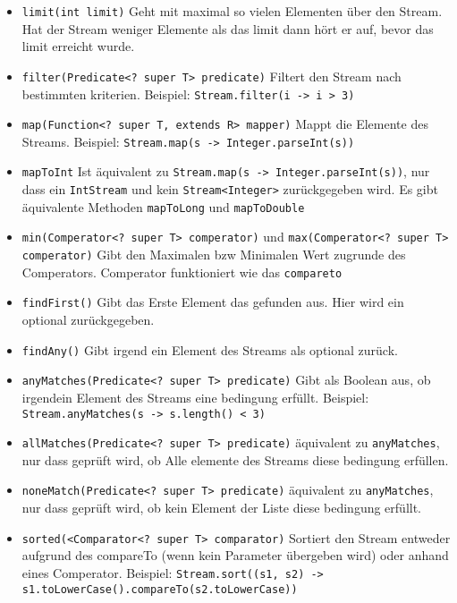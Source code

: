 \begin{itemize}
    \item \lstinline{limit(int limit)} Geht mit maximal so vielen Elementen
          über den Stream. Hat der Stream weniger Elemente als das limit dann
          hört er auf, bevor das limit erreicht wurde.
    \item \lstinline{filter(Predicate<? super T> predicate)} Filtert den Stream nach bestimmten
          kriterien. Beispiel: \lstinline{Stream.filter(i -> i > 3)}
    \item \lstinline{map(Function<? super T, extends R> mapper)} Mappt die Elemente des Streams.
          Beispiel: \lstinline{Stream.map(s -> Integer.parseInt(s))}
    \item \lstinline{mapToInt} Ist äquivalent zu \lstinline{Stream.map(s -> Integer.parseInt(s))},
          nur dass ein \lstinline{IntStream} und kein \lstinline{Stream<Integer>} zurückgegeben wird.
          Es gibt äquivalente Methoden \lstinline{mapToLong} und \lstinline{mapToDouble}
    \item \lstinline{min(Comperator<? super T> comperator)} und \lstinline{max(Comperator<? super T> comperator)}
          Gibt den Maximalen bzw Minimalen Wert zugrunde des Comperators. Comperator funktioniert
          wie das \lstinline{compareto}
    \item \lstinline{findFirst()} Gibt das Erste Element das gefunden aus. Hier wird ein
          \gls{optional} zurückgegeben.
    \item \lstinline{findAny()} Gibt irgend ein Element des Streams als \gls{optional} zurück.
    \item \lstinline{anyMatches(Predicate<? super T> predicate)} Gibt als Boolean aus, ob
          irgendein Element des Streams eine bedingung erfüllt. Beispiel:
          \lstinline{Stream.anyMatches(s -> s.length() < 3)}
    \item \lstinline{allMatches(Predicate<? super T> predicate)} äquivalent zu \lstinline{anyMatches},
          nur dass geprüft wird, ob Alle elemente des Streams diese bedingung erfüllen.
    \item \lstinline{noneMatch(Predicate<? super T> predicate)} äquivalent zu \lstinline{anyMatches},
          nur dass geprüft wird, ob kein Element der Liste diese bedingung erfüllt.
        \item \lstinline{sorted(<Comparator<? super T> comparator)} Sortiert den Stream entweder
        aufgrund des compareTo (wenn kein Parameter übergeben wird) oder anhand eines Comperator.
        Beispiel: \lstinline{Stream.sort((s1, s2) -> s1.toLowerCase().compareTo(s2.toLowerCase))}
\end{itemize}